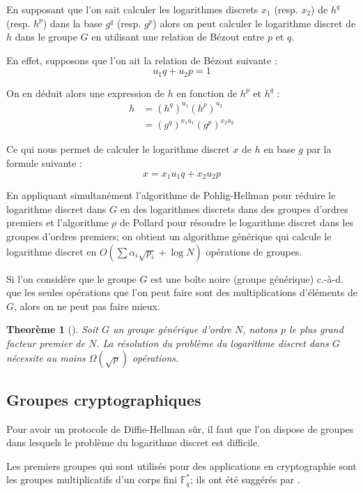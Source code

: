 \documentclass[a4paper,12pt]{article}
\newtheorem{theoreme}{Theorème}[section]
\theoremstyle{definition}
\theoremstyle{remark}
\numberwithin{equation}{section}
\begin{document}
En supposant que l'on sait calculer les logarithmes discrets $x_1$ (resp. $x_2$) de $h^q$ (resp. $h^p$) dans la base $g^q$ (resp. $g^p$) alors on peut calculer le logarithme discret de $h$ dans le groupe $G$ en utilisant une relation de Bézout entre $p$ et $q$. 

En effet, supposons que l'on ait la relation de Bézout suivante :
$$u_1 q + u_2 p = 1$$

On en déduit alors une expression de $h$ en fonction de $h^p$ et $h^q$ :
\begin{align*}
h &= (h^q)^{u_1}(h^p)^{u_2} \\
  &= (g^q)^{x_1u_1}(g^p)^{x_2u_2}
\end{align*}

Ce qui nous permet de calculer le logarithme discret $x$ de $h$ en base $g$ par la formule suivante :
$$x = x_1 u_1 q + x_2 u_2 p$$

En appliquant simultanément l'algorithme de Pohlig-Hellman pour réduire le logarithme discret dans $G$ en des logarithmes discrets dans des groupes d'ordres premiers et l'algorithme $\rho$ de Pollard pour résoudre le logarithme discret dans les groupes d'ordres premiers; on obtient un algorithme générique qui calcule le logarithme discret en $O(\sum{\alpha_i\sqrt{p_i}}+\log N)$ opérations de groupes.

Si l'on considère que le groupe $G$ est une boîte noire (groupe générique) c.-à-d. que les seules opérations que l'on peut faire sont des multiplications d'éléments de $G$, alors on ne peut pas faire mieux.

\begin{theoreme}[\citet{shoup}]
\label{borneShoup}
Soit $G$ un groupe générique d'ordre $N$, notons $p$ le plus grand facteur premier de $N$. La résolution du problème du logarithme discret dans $G$ nécessite au moins $\Omega(\sqrt{p})$ opérations. 
\end{theoreme}

\subsection{Groupes cryptographiques}
Pour avoir un protocole de Diffie-Hellman sûr, il faut que l'on dispose de groupes dans lesquels le problème du logarithme discret est difficile.

Les premiers groupes qui sont utilisés pour des applications en cryptographie sont les groupes multiplicatifs d'un corps fini $\mathbb{F}^*_q$; ils ont été suggérés par \citet{diffie-hellman}.
\end{document}
